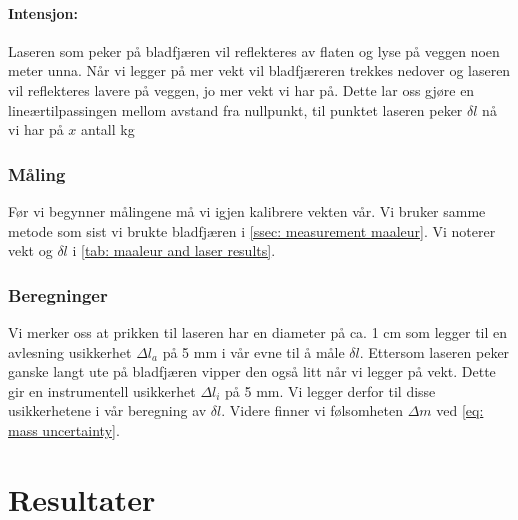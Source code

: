 \documentclass[reprint,norsk,notitlepage]{revtex4-2}
\begin{document}
\paragraph{\bf Intensjon:}
Laseren som peker på bladfjæren vil reflekteres av flaten og lyse på veggen noen meter unna. Når vi legger på mer vekt vil bladfjæreren trekkes nedover og laseren vil reflekteres lavere på veggen, jo mer vekt vi har på. Dette lar oss gjøre en lineærtilpassingen mellom avstand fra nullpunkt, til punktet laseren peker $δl$ nå vi har på $x$ antall kg

\subsubsection{Måling}
Før vi begynner målingene må vi igjen kalibrere vekten vår. Vi bruker samme metode som sist vi brukte bladfjæren i \ref{ssec: measurement maaleur}. Vi noterer vekt og $δl$ i \cref{tab: maaleur and laser results}.

\subsubsection{Beregninger}
Vi merker oss at prikken til laseren har en diameter på ca. 1 cm som legger til en avlesning usikkerhet $Δl_a$ på 5 mm i vår evne til å måle $δl$. Ettersom laseren peker ganske langt ute på bladfjæren vipper den også litt når vi legger på vekt. Dette gir en instrumentell usikkerhet $Δl_i$ på 5 mm. Vi legger derfor til disse usikkerhetene i vår beregning av $δl$. Videre finner vi følsomheten $Δm$ ved \cref{eq: mass uncertainty}.


\newpage
\section{Resultater} \label{sec: results}
\end{document}
